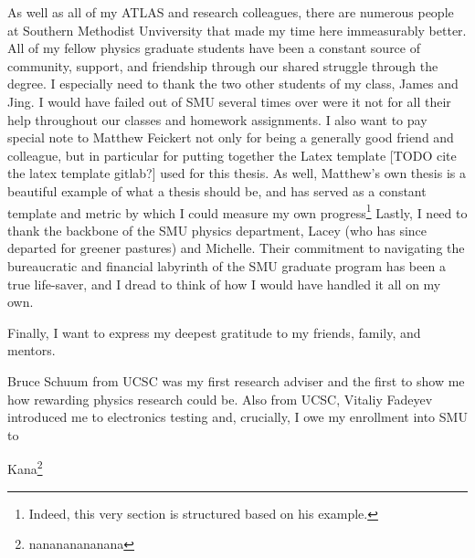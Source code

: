 As well as all of my ATLAS and research colleagues,
    there are numerous people at Southern Methodist Unviversity that made my time here immeasurably better.
All of my fellow physics graduate students have been a constant source of community, support, and friendship
    through our shared struggle through the degree.
I especially need to thank the two other students of my class, James and Jing.
I would have failed out of SMU several times over were it not
    for all their help throughout our classes and homework assignments.
I also want to pay special note to Matthew Feickert not only for being a generally good friend and colleague,
    but in particular for putting together the Latex template [TODO cite the latex template gitlab?]
    used for this thesis.
As well, Matthew's own thesis\cite{matthew_feickert} is a beautiful example of what a thesis should be,
    and has served as a constant template and metric by which I could measure my own progress\footnote{
        Indeed, this very section is structured based on his example.
    }
Lastly, I need to thank the backbone of the SMU physics department, 
    Lacey (who has since departed for greener pastures) and Michelle.
Their commitment to navigating the bureaucratic and financial labyrinth of the SMU graduate program
    has been a true life-saver, and I dread to think of how I would have handled it all on my own.



Finally, I want to express my deepest gratitude to my friends, family, and mentors.

Bruce Schuum from UCSC was my first research adviser
    and the first to show me how rewarding physics research could be.
Also from UCSC, Vitaliy Fadeyev introduced me to electronics testing
    and, crucially, I owe my enrollment into SMU to 







Kana\footnote{nanananananana}

